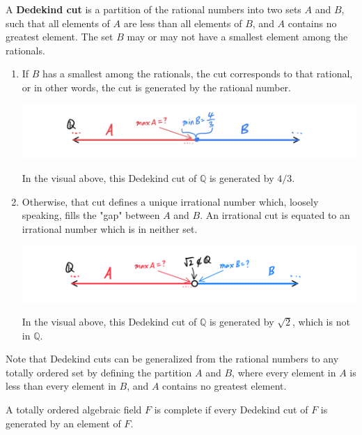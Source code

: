 \documentclass{article}
\begin{document}
        \begin{definition}
          A \textbf{Dedekind cut} is a partition of the rational numbers into two sets $A$ and $B$, such that all elements of $A$ are less than all elements of $B$, and $A$ contains no greatest element. The set $B$ may or may not have a smallest element among the rationals. 
          \begin{enumerate}
          \item If $B$ has a smallest among the rationals, the cut corresponds to that rational, or in other words, the cut is generated by the rational number. 
          \begin{center}
            \includegraphics[scale=0.25]{img/Dedekind_Cut_Rational.PNG}
          \end{center}
          In the visual above, this Dedekind cut of $\mathbb{Q}$ is generated by $4/3$. 
          \item Otherwise, that cut defines a unique irrational number which, loosely speaking, fills the "gap" between $A$ and $B$. An irrational cut is equated to an irrational number which is in neither set. 
          \begin{center}
            \includegraphics[scale=0.25]{img/Dedekind_Cut_Irrational.PNG}
          \end{center}
          In the visual above, this Dedekind cut of $\mathbb{Q}$ is generated by $\sqrt{2}$, which is not in $\mathbb{Q}$. 
          \end{enumerate}
          Note that Dedekind cuts can be generalized from the rational numbers to any totally ordered set by defining the partition $A$ and $B$, where every element in $A$ is less than every element in $B$, and $A$ contains no greatest element. 
        \end{definition}

        \begin{definition}
          A totally ordered algebraic field $F$ is complete if every Dedekind cut of $F$ is generated by an element of $F$. 
        \end{definition}
\end{document}
